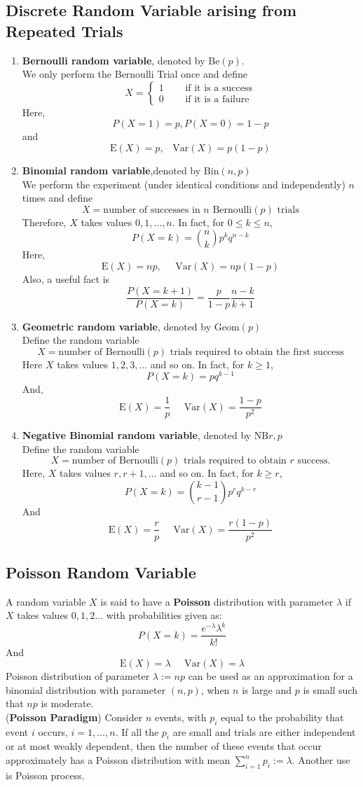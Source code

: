\documentclass[12pt]{article}
\newcommand{\be}{\mathrm{Be}}
\newcommand{\var}{\mathrm{Var}}
\newcommand{\expec}{\mathrm{E}}
\newcommand{\bin}{\mathrm{Bin}}
\newcommand{\geom}{\mathrm{Geom}}
\newcommand{\nb}{\mathrm{NB}}
\theoremstyle{definition}
\begin{document}
\subsection{Discrete Random Variable arising from Repeated Trials}
\begin{enumerate}
\item \textbf{Bernoulli random variable}, denoted by $\be(p)$.\\
We only perform the Bernoulli Trial once and define
\[
X=\begin{cases}
1\;\;\;\;\;&\text{if it is a success}\\
0\;\;\;\;\;&\text{if it is a failure}
\end{cases}
\]
Here,
\[
P(X=1)=p, P(X=0)=1-p
\]
and
\[
\expec(X)=p,\;\;\;\var(X)=p(1-p)
\]
\item \textbf{Binomial random variable},denoted by $\bin(n,p)$\\
We perform the experiment (under identical conditions and independently) $n$ times and define
\[
X = \text{number of successes in }n \text{ Bernoulli}(p)\text{ trials}
\]
Therefore, $X$ takes values $0,1,\ldots,n$. In fact, for $0\leq k\leq n$,
\[
P(X=k)=\binom{n}{k} p^kq^{n-k}
\]
Here,
\[
\expec(X)=np, \;\;\;\;\;\var(X)=np(1-p)
\]
Also, a useful fact is
\[
\frac{P(X=k+1)}{P(X=k)}=\frac{p}{1-p}\frac{n-k}{k+1}
\]
\item \textbf{Geometric random variable}, denoted by $\geom(p)$\\
Define the random variable
\[
X=\text{number of Bernoulli}(p) \text{ trials required to obtain the first success}
\]
Here $X$ takes values $1,2,3,\ldots$ and so on. In fact, for $k\geq 1$,
\[
P(X=k)=pq^{k-1}
\]
And,
\[
\expec(X)=\frac{1}{p}\;\;\;\;\;\var(X)=\frac{1-p}{p^2}
\]
\item \textbf{Negative Binomial random variable}, denoted by $\nb{r,p}$\\
Define the random variable
\[
X=\text{number of Bernoulli}(p)\text{ trials required to obtain }r\text{ success.}
\]
Here, $X$ takes values $r,r+1,\ldots$ and so on. In fact, for $k\geq r$,
\[
P(X=k)=\binom{k-1}{r-1}p^rq^{k-r}
\]
And
\[
\expec(X)=\frac{r}{p}\;\;\;\;\;\var(X)=\frac{r(1-p)}{p^2}
\]
\end{enumerate}
\subsection{Poisson Random Variable}
A random variable $X$ is said to have a \textbf{Poisson} distribution with parameter $\lambda$ if $X$ takes values $0,1,2\ldots$ with probabilities given as:
\[
P(X=k) = \frac{e^{-\lambda}\lambda^k}{k!}
\]
And
\[
\expec(X)=\lambda\;\;\;\;\;\var(X)=\lambda
\]
Poisson distribution of parameter $\lambda:=np$ can be used as an approximation for a binomial distribution with parameter $(n,p)$, when $n$ is large and $p$ is small such that $np$ is moderate.\\
(\textbf{Poisson Paradigm}) Consider $n$ events, with $p_i$ equal to the probability that event $i$ occurs, $i = 1,\ldots, n$. If all the $p_i$ are small and trials are either independent or at most weakly dependent, then the number of these events that occur approximately has a Poisson distribution with mean $\sum_{i=1}^n p_i :=\lambda$.
Another use is Poisson process.
\end{document}
